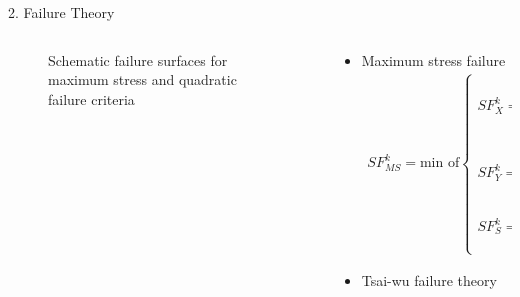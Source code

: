\documentclass{beamer}
\begin{document}
\begin{frame}{2. Failure Theory }
\begin{columns}[c]
    \begin{column}{0.4\textwidth}
		\begin{figure}
		\centering
		\caption{Schematic failure surfaces for maximum stress and quadratic failure
		criteria}
		\end{figure}
    \end{column}
    \begin{column}{0.6\textwidth}
		\begin{itemize}
			\item  Maximum stress failure
				\begingroup
				\small
				\begin{align*}
					SF_{MS}^k = \text{min of}
					\begin{cases}
						SF_X^k = 
						\begin{cases}
							\frac{X_t}{\sigma_{11}}, \text{ if } \sigma_{11}>0 \\
							\frac{X_c}{\sigma_{11}}, \text{ if } \sigma_{11}<0 \\
						\end{cases} \\
						SF_Y^k = 
						\begin{cases}
							\frac{Y_t}{\sigma_{22}}, \text{ if } \sigma_{22}>0 \\
							\frac{Y_c}{\sigma_{22}}, \text{ if } \sigma_{22}<0 \\
						\end{cases} \\
						SF_S^k =
						\begin{cases}
							\frac{S}{|\tau_{12}|} \\
						\end{cases} \\
					\end{cases} \textstyle{.}
				\end{align*}
				\endgroup
			\item  Tsai-wu failure theory


\end{itemize}
\end{column}
\end{columns}
\end{frame}
\end{document}
